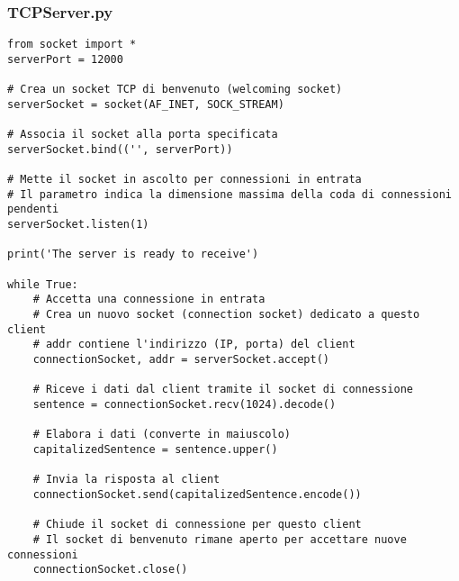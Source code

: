 \subsubsection{TCPServer.py}
\begin{verbatim}
from socket import *
serverPort = 12000

# Crea un socket TCP di benvenuto (welcoming socket)
serverSocket = socket(AF_INET, SOCK_STREAM)

# Associa il socket alla porta specificata
serverSocket.bind(('', serverPort))

# Mette il socket in ascolto per connessioni in entrata
# Il parametro indica la dimensione massima della coda di connessioni pendenti
serverSocket.listen(1)

print('The server is ready to receive')

while True:
    # Accetta una connessione in entrata
    # Crea un nuovo socket (connection socket) dedicato a questo client
    # addr contiene l'indirizzo (IP, porta) del client
    connectionSocket, addr = serverSocket.accept()
    
    # Riceve i dati dal client tramite il socket di connessione
    sentence = connectionSocket.recv(1024).decode()
    
    # Elabora i dati (converte in maiuscolo)
    capitalizedSentence = sentence.upper()
    
    # Invia la risposta al client
    connectionSocket.send(capitalizedSentence.encode())
    
    # Chiude il socket di connessione per questo client
    # Il socket di benvenuto rimane aperto per accettare nuove connessioni
    connectionSocket.close()
\end{verbatim}

